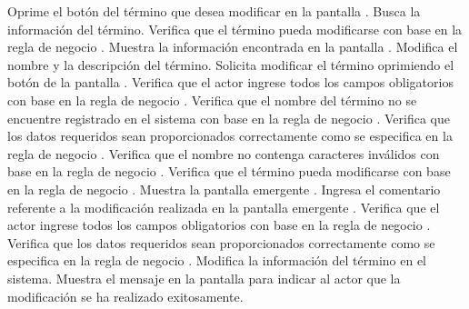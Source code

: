  \begin{UCtrayectoria}
	\UCpaso[\UCactor] Oprime el botón \btnEditar del término que desea modificar en la pantalla .
	\UCpaso[\UCsist] Busca la información del término.
	\UCpaso[\UCsist] Verifica que el término pueda modificarse con base en la regla de negocio . 
    \UCpaso[\UCsist] Muestra la información encontrada en la pantalla .
    \UCpaso[\UCactor] Modifica el nombre y la descripción del término. \label{cu10.2:ingresaDatos}
    \UCpaso[\UCactor] Solicita modificar el término oprimiendo el botón  de la pantalla .  
    \UCpaso[\UCsist] Verifica que el actor ingrese todos los campos obligatorios con base en la regla de negocio  . 
    \UCpaso[\UCsist] Verifica que el nombre del término no se encuentre registrado en el sistema con base en la regla de negocio  . 
    \UCpaso[\UCsist] Verifica que los datos requeridos sean proporcionados correctamente como se especifica en la regla de negocio .  
    \UCpaso[\UCsist] Verifica que el nombre no contenga caracteres inválidos con base en la regla de negocio . 
	\UCpaso[\UCsist] Verifica que el término pueda modificarse con base en la regla de negocio . 
	\UCpaso[\UCsist] Muestra la pantalla emergente .
	\UCpaso[\UCactor] Ingresa el comentario referente a la modificación realizada en la pantalla emergente . \label{cu10.2:ingresaComentario}
    \UCpaso[\UCsist] Verifica que el actor ingrese todos los campos obligatorios con base en la regla de negocio  . 
    \UCpaso[\UCsist] Verifica que los datos requeridos sean proporcionados correctamente como se especifica en la regla de negocio . 
    \UCpaso[\UCsist] Modifica la información del término en el sistema.
    \UCpaso[\UCsist] Muestra el mensaje  en la pantalla 
    para indicar al actor que la modificación se ha realizado exitosamente.
 \end{UCtrayectoria}
 
